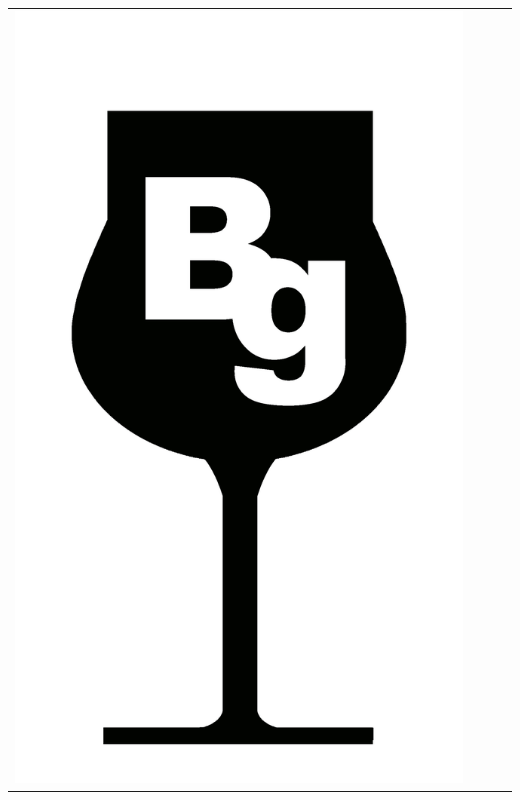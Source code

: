 {\begin{center}
\begin{tabular}{ c c c c}
\includegraphics[scale=0.021, trim= 0em -5em -5em -5em,]{Icones/icon_bourgogne_black.pdf}
&

\end{tabular}
\end{center}}
